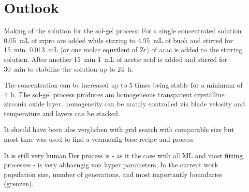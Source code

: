 \documentclass[a4paper]{article}
\newcommand{\ml}[1]{\SI{#1}{\milli\liter}}
\newcommand{\minutes}[1]{\SI{#1}{\minute}}
\newcommand{\h}[1]{\SI{#1}{\hour}}
\begin{document}
\section{Outlook}

Making of the solution for the sol-gel process:
For a single concentrated solution \ml{0.05} of \gls{zrpro} are added while stirring to \ml{4.95} of \gls{buoh} and stirred for \minutes{15}. 
\ml{0.013} (or one molar equvilent of Zr) of \gls{acac} is added to the stirring solution. 
After another \minutes{15} \ml{1} of acetic acid is added and stirred for \minutes{30} to stabilize the solution up to \h{24}. 

The concentration can be increased up to 5 times being stable for a minimum of \h{4}. 
The sol-gel process produces am homogeneous transparent crystalline zirconia oxide layer. 
homogeneity can be mainly controlled via blade velocity and temperature and layers can be stacked.

It should have been alos verglichen with grid search with comparable size
but most time was used to find a vernuenfig base recipe and process

It is still very human 
Der process is - as it the case with all ML and most fitting processes - is very abhaengig von hyper parameters, 
In the current work population size, number of generations, and most importantly boundaries (grenzen). 




\end{document}
